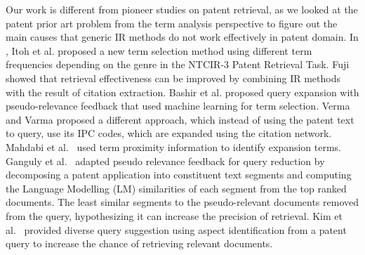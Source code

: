 

Our work is different from pioneer studies on patent retrieval, as we
looked at the patent prior art problem from the term analysis perspective to figure out the main 
causes that generic IR methods do not work effectively in patent domain. 
In \cite{Itoh2003}, Itoh et al. proposed a new term selection method using different term
frequencies depending on the genre in the NTCIR-3 Patent Retrieval Task.
Fuji \cite{Fujii2007}
showed that retrieval effectiveness can be improved by combining IR
methods with the result of citation extraction.
Bashir et al. \cite{Bashir2010} proposed query expansion with pseudo-relevance
feedback that used machine learning for term selection.
Verma and Varma
\cite{Verma2011} proposed a different approach, which instead of using
the patent text to query, use its IPC codes, which are expanded using the citation network.
Mahdabi et al.~\cite{Mahdabi2013} used term proximity
information to identify expansion terms. Ganguly et
al.~\cite{ganguly2011patent} adapted pseudo relevance feedback for
query reduction by decomposing a patent application into constituent
text segments and computing the Language Modelling (LM) similarities
of each segment from the top ranked documents. The least similar
segments to the pseudo-relevant documents removed from the query,
hypothesizing it can increase the precision of retrieval. Kim et
al.~\cite{kim2014diversifying} provided diverse query suggestion using
aspect identification from a patent query to increase the chance of
retrieving relevant documents. 












